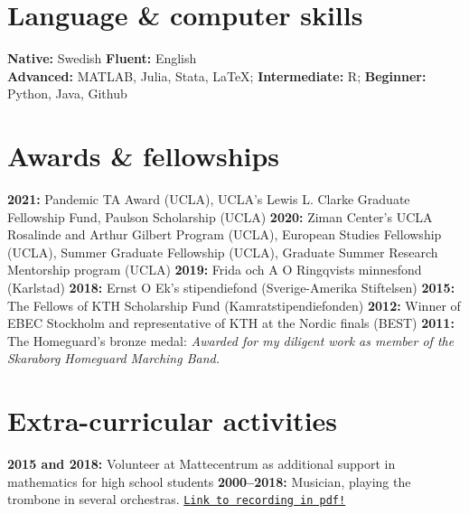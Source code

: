 \documentclass[letterpaper,10pt]{article}
\newcommand{\bold}[1]{\ifhmode\hspace{6pt}\fi\textbf{#1:}}
\begin{document}
\section*{Language \& computer skills}
\bold{Native} Swedish \bold{Fluent} English \\
\bold{Advanced} MATLAB, Julia, Stata, \LaTeX; \bold{Intermediate} R; \bold{Beginner} Python, Java, Github

\section*{Awards \& fellowships}
\bold{2021} Pandemic TA Award (UCLA), UCLA’s Lewis L. Clarke Graduate Fellowship Fund, Paulson Scholarship (UCLA) \bold{2020} Ziman Center’s UCLA Rosalinde and Arthur Gilbert Program (UCLA), European Studies Fellowship (UCLA), Summer Graduate Fellowship (UCLA), Graduate Summer Research Mentorship program (UCLA) \bold{2019} Frida och A O Ringqvists minnesfond (Karlstad) \bold{2018} Ernst O Ek's stipendiefond (Sverige-Amerika Stiftelsen) \bold{2015}
The Fellows of KTH Scholarship Fund (Kamratstipendiefonden) \bold{2012} Winner of EBEC Stockholm and representative of KTH at the Nordic finals (BEST) \bold{2011} The Homeguard's bronze medal: \emph{Awarded for my diligent work as member of the Skaraborg Homeguard Marching Band.}

\section*{Extra-curricular activities} 
\bold{2015 and 2018} Volunteer at Mattecentrum as additional support in mathematics for high school students \bold{2000--2018} Musician, playing the trombone in several orchestras. \href{https://www.youtube.com/watch?v=nn6dDYi3AFg}{\texttt{Link to recording in pdf!}}
\iffalse
\iffalse
\emph{Several elected positions} in my division of KTH Student association, including:
\begin{lista2}
\emph{Treasurer} for a committee, \\
\emph{Producer} (head) for a play involving 100 people.  \bold{2011--2015}
\end{lista2}
\fi
\emph{Musician}, playing the trombone in several orchestras.%
\bold{2000--2018}

\fi
\end{document}
